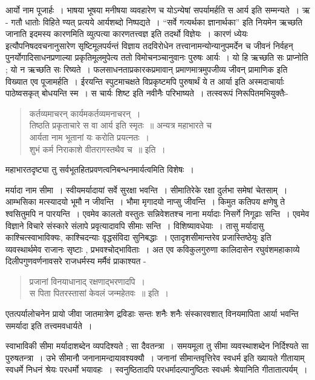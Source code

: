 {आर्यो नाम पूजार्हः~। भाषया भूषया मनीषया व्यवहारेण च योऽन्येषां सपर्यामर्हति स आर्य इति सम्मन्यते~। ऋ - गतौ धातोः विहिते ण्यत् प्रत्यये आर्यशब्दो निष्पद्यते~। “सर्वे गत्यर्थका ज्ञानार्थका” इति नियमेन ऋच्छति जानाति इदमस्य कारणमिति व्युत्पत्या कारणतत्त्वज्ञ इति तदर्थो विज्ञेयः~। कारणं ध्येयः इत्यौपनिषदवचनानुसारेण सृष्टिमूलपर्यन्तं विज्ञाय तदविरोधेन तत्त्वानामन्योन्यानुपमर्देन च जीवनं निर्वहन् पुनर्योगादिसाधनप्रणाल्या प्रकृतिमूलमुपेत्य ततो विमोचनञ्चानुवानः पुरुषः आर्यः~। यो हि ऋच्छति सः प्राप्नोति ; यो न ऋच्छति सः रिष्यते~। फलसाधनताप्रकारकप्रमावान् प्रमाणमात्रमुपजीव्य जीवन् प्रामाणिक इति विख्यात एव पूजामर्हति~। ईरयन्ति स्पुटमाचक्षते विप्रकृष्टमपि पुरुषार्थं ये त आर्या इति अस्मदाचार्याः पाठेष्वसकृत् बोधयन्ति स्म~। स चार्यः शिष्ट इति नवीनैः परिभाष्यते~। तत्स्वरूपं निरूपितमभियुक्तैः-
\begin{verse}
कर्तव्यमाचरन् कार्यमकर्तव्यमनाचरन्~। \\
तिष्ठति प्रकृताचारे स वा आर्य इति स्मृतः~॥  अन्यत्र महाभारते च\enginline{-}\\
आर्यता नाम भूतानां यः करोति प्रयत्नतः~। \\
शुभं कर्म निराकाशे वीतरागस्तथैव च~॥ इति~। 
\end{verse}
महाभारतदृष्ट्या तु सर्वभूतहितप्रवणत्वनिबन्धनमार्यत्वमिति विशेषः~। 

मर्यादा नाम सीमा~। स्वीयमर्यादायां सर्वे सुरक्षा भवन्ति~। सीमातिरेके रक्षा दुर्लभा समेषां चेतसाम्~। आम्भसिका मत्स्यादयो भूमौ न जीवन्ति~। भौमा मृगादयो नाप्सु जीवन्ति~। किमुत कतिपय क्षणेषु ते श्वसितुमपि न पारयन्ति~। एवमेव कालतो वस्तुतः सन्निवेशतश्च नाना मर्यादाः निसर्गे निगूढाः सन्ति~। एवमेव विज्ञाने विचारे संस्कारे संलापे प्रवृत्यादावपि सीमाः सन्ति~। विशिष्यावधेयाः~। तासु मर्यादासु काश्चित्स्वाभाविक्यः, काश्चिदन्याः वृद्धसंविदा सुनिबद्धाः~। एतादृशसीमान्तरेव प्रजास्तिष्ठेयुः इति व्यवस्थार्थमेव राजानः सृष्टाः , प्रभवश्चोद्भाविताः~। अत एव कविकुलगुरुणा कालिदासेन रघुवंशमहाकाव्ये दिलीपगुणवर्णनावसरे राजधर्मस्य मर्मैवं प्राकाश्यत -
\begin{verse}
प्रजानां विनयाधानाद् रक्षणाद्भरणादपि~। \\ 
स पिता पितरस्तासां केवलं जन्महेतवः~॥ इति~। 
\end{verse}
एतत्पर्यालोचनेन प्रायो जीवा जातमात्रेण द्रविडाः सन्तः शनैः शनैः संस्कारवशात् विनयमापिता आर्या भवन्ति समर्यादा इति तत्त्वमवधार्यते~। 

स्वाभाविकी सीमा मर्यादाशब्देन व्यपदिश्यते ; सा दैवतन्त्रा~। समयमूला तु सीमा व्यवस्थाशब्देन निर्दिश्यते सा पुरुषतन्त्रा~।  उभे सीमानौ जनानामन्दायावश्यक्यौ~। जनानां सीमान्तवृत्तिरेव स्वधर्म इति ख्यायते गीतायाम् \enginline{-} स्वधर्मे निधनं श्रेयः परधर्मो भयावहः~। स्वनुष्ठितादपि परधर्मादल्पानुष्ठितः स्वधर्मः श्रेयानिति गीतातात्पर्यम्~। 

}
